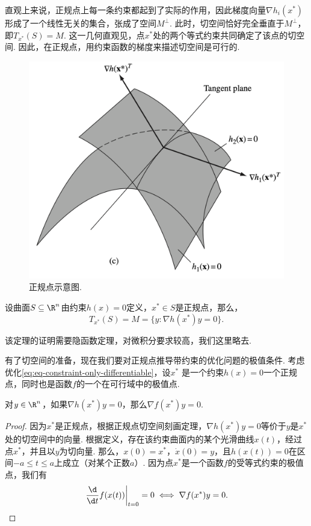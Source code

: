 直观上来说，正规点上每一条约束都起到了实际的作用，因此梯度向量$\nabla h_i({x^\ast})$形成了一个线性无关的集合，张成了空间$M^\perp$. 此时，切空间恰好完全垂直于$M^\perp$，即$T_{x^\ast}(S)=M$. 这一几何直观见，点${x^\ast }$处的两个等式约束共同确定了该点的切空间. 因此，在正规点，用约束函数的梯度来描述切空间是可行的. 
    \begin{figure}
        \centering
        \includegraphics[scale=0.17]{Figures/duality/tan-2constraint.png}
        \caption{正规点示意图. }
        \label{fig:tan-2constraint}
    \end{figure}

\begin{theorem}[正规点切空间刻画定理]
设曲面$S\subseteq\R^n$由约束$h(x)=0$定义，${x^\ast}\in S$是正规点，那么，
\[T_{x^\ast}(S)=M=\{{y:\nabla h(x^\ast)y=0}\}.\]
\end{theorem}
该定理的证明需要隐函数定理，对微积分要求较高，我们这里略去.

有了切空间的准备，现在我们要对正规点推导带约束的优化问题的极值条件. 考虑优化\eqref{eq:eq-constraint-only-differentiable}，设$x^\ast$ 是一个约束${h(x)=0}$一个正规点，同时也是函数$f$的一个在可行域中的极值点.

\begin{lemma}\label{lemma:eq-opt-cond-1}
对$y\in\R^n$，如果$\nabla {h(x^\ast)y=0}$，那么$\nabla f({x^\ast}){y}=0$.
\end{lemma}

\begin{proof}
因为$x^\ast$是正规点，根据正规点切空间刻画定理，$\nabla h(x^*)y=0$等价于$y$是${x^\ast}$处的切空间中的向量. 根据定义，存在该约束曲面内的某个光滑曲线${x}(t)$，经过点${x^\ast}$，并且以$y$为切向量. 那么，${x}(0)={x^\ast}$，${\dot{x}}(0)={y}$，且${h(x(t))=0}$在区间$-a\leq t\leq a$上成立（对某个正数$a$）. 因为点${x^\ast}$是一个函数$f$的受等式约束的极值点，我们有
\[\left.\frac{\d}{\d t}f({x}(t))\right|_{t=0}=0\iff \nabla f({x^\ast})y=0.\]
\end{proof}

